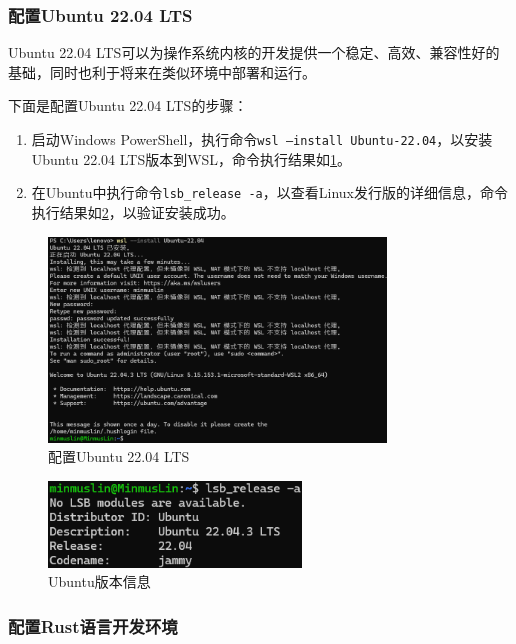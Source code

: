 \subsubsection{配置Ubuntu 22.04 LTS}

Ubuntu 22.04 LTS可以为操作系统内核的开发提供一个稳定、高效、兼容性好的基础，同时也利于将来在类似环境中部署和运行。

下面是配置Ubuntu 22.04 LTS的步骤：

\begin{enumerate}
    \item 启动Windows PowerShell，执行命令\texttt{wsl --install Ubuntu-22.04}，以安装Ubuntu 22.04 LTS版本到WSL，命令执行结果如\cref{fig:ConfigureUbuntu}。
    \item 在Ubuntu中执行命令\texttt{lsb\_release -a}，以查看Linux发行版的详细信息，命令执行结果如\cref{fig:UbuntuVersion}，以验证安装成功。
\end{enumerate}

\begin{figure}[htbp]
    \centering
    \includegraphics[width=0.8\textwidth]{figures/ConfigureUbuntu.png}
    \caption{配置Ubuntu 22.04 LTS}
    \label{fig:ConfigureUbuntu}
\end{figure}

\begin{figure}[htbp]
    \centering
    \includegraphics[width=0.6\textwidth]{figures/UbuntuVersion.png}
    \caption{Ubuntu版本信息}
    \label{fig:UbuntuVersion}
\end{figure}

\subsubsection{配置Rust语言开发环境}

